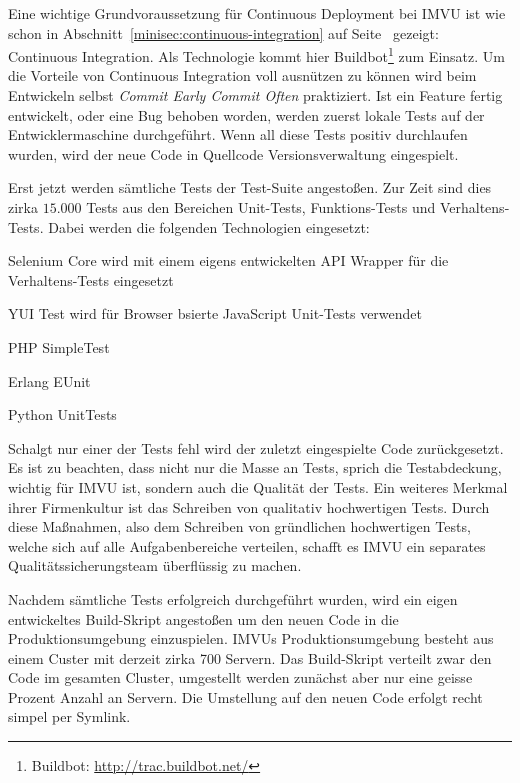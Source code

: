  Eine wichtige Grundvoraussetzung für Continuous Deployment
bei IMVU ist wie schon in Abschnitt~\ref{minisec:continuous-integration} auf
Seite~\pageref{minisec:continuous-integration} gezeigt: Continuous
Integration. Als Technologie kommt hier Buildbot\footnote{Buildbot:
\url{http://trac.buildbot.net/}} zum Einsatz. Um die Vorteile von Continuous
Integration voll ausnützen zu können wird beim Entwickeln selbst \emph{Commit
Early Commit Often} praktiziert. Ist ein Feature fertig entwickelt, oder eine
Bug behoben worden, werden zuerst lokale  Tests auf der Entwicklermaschine
durchgeführt. Wenn all diese Tests positiv durchlaufen wurden, wird der neue
Code in Quellcode Versionsverwaltung eingespielt.

Erst jetzt werden sämtliche Tests der Test-Suite angestoßen. Zur Zeit sind
dies zirka $15.000$ Tests aus den Bereichen Unit-Tests, Funktions-Tests und
Verhaltens-Tests. Dabei werden die folgenden Technologien eingesetzt:

\begin{itemize*}
    \item Selenium Core wird mit einem eigens entwickelten API Wrapper für
          die Verhaltens-Tests eingesetzt
    \item YUI Test wird für Browser bsierte JavaScript Unit-Tests verwendet
    \item PHP SimpleTest
    \item Erlang EUnit
    \item Python UnitTests
\end{itemize*}

Schalgt nur einer der Tests fehl wird der zuletzt eingespielte Code
zurückgesetzt. Es ist zu beachten, dass nicht nur die Masse an Tests, sprich
die Testabdeckung, wichtig für IMVU ist, sondern auch die Qualität der Tests.
Ein weiteres Merkmal ihrer Firmenkultur ist das Schreiben von qualitativ
hochwertigen Tests. Durch diese Maßnahmen, also dem Schreiben von gründlichen
hochwertigen Tests, welche sich auf alle Aufgabenbereiche verteilen, schafft
es IMVU ein separates Qualitätssicherungsteam überflüssig zu machen.

Nachdem sämtliche Tests erfolgreich durchgeführt wurden, wird ein eigen
entwickeltes Build-Skript angestoßen um den neuen Code in die
Produktionsumgebung einzuspielen. IMVUs Produktionsumgebung besteht aus einem
Custer mit derzeit zirka 700 Servern. Das Build-Skript verteilt zwar den Code
im gesamten Cluster, umgestellt werden zunächst aber nur eine geisse Prozent
Anzahl an Servern. Die Umstellung auf den neuen Code erfolgt recht simpel per
Symlink. 

